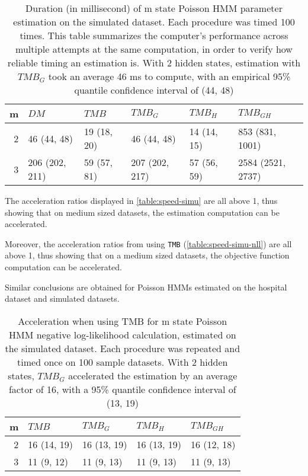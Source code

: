 \documentclass[bimj,fleqn]{w-art}\usepackage[]{graphicx}\usepackage[]{color}
\theoremstyle{plain}
\theoremstyle{definition}
\begin{document}
\begin{table}[ht]
\centering
\begin{tabular}{rlllll}
  \hline
m & \textit{${DM}$} & \textit{${TMB}$} & \textit{${TMB_G}$} & \textit{${TMB_H}$} & \textit{${TMB_{GH}}$} \\ 
  \hline
2 & 46 (44, 48) & 19 (18, 20) & 46 (44, 48) & 14 (14, 15) & 853 (831, 1001) \\ 
  3 & 206 (202, 211) & 59 (57, 81) & 207 (202, 217) & 57 (56, 59) & 2584 (2521, 2737) \\ 
   \hline
\end{tabular}
\caption{Duration (in millisecond) of m state Poisson HMM parameter estimation on the simulated dataset. Each procedure was timed 100 times. This table summarizes the computer's performance across multiple attempts at the same computation, in order to verify how reliable timing an estimation is. With 2 hidden states, estimation with $TMB_G$ took an average 46  ms to compute, with an empirical 95\% quantile confidence interval of (44, 48)} 
\label{table:speed-consistency-simu}
\end{table}

The acceleration ratios displayed in \autoref{table:speed-simu} are all above 1, thus showing that on medium sized datasets, the estimation computation can be accelerated.

Moreover, the acceleration ratios from using {\tt{TMB}} (\autoref{table:speed-simu-nll}) are all above 1, thus showing that on a medium sized datasets, the objective function computation can be accelerated.

Similar conclusions are obtained for Poisson HMMs estimated on the hospital dataset and simulated datasets.

\begin{table}[ht]
\centering
\begin{tabular}{rllll}
  \hline
m & \textit{${TMB}$} & \textit{${TMB_G}$} & \textit{${TMB_H}$} & \textit{${TMB_{GH}}$} \\ 
  \hline
2 & 16 (14, 19) & 16 (13, 19) & 16 (13, 19) & 16 (12, 18) \\ 
  3 & 11 (9, 12) & 11 (9, 13) & 11 (9, 13) & 11 (9, 13) \\ 
   \hline
\end{tabular}
\caption{Acceleration when using TMB for m state Poisson HMM negative log-likelihood calculation, estimated on the simulated dataset. Each procedure was repeated and timed once on 100 sample datasets. With 2 hidden states, $TMB_G$ accelerated the estimation by an average factor of 16, with a 95\% quantile confidence interval of (13, 19)} 
\label{table:speed-simu-nll}
\end{table}
\end{document}
